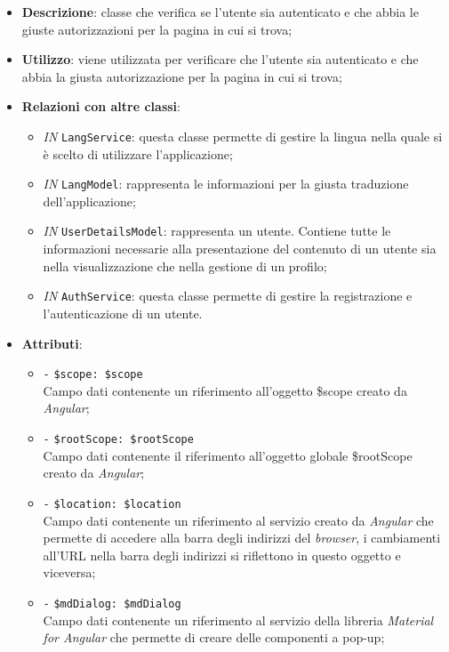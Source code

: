 		\begin{itemize}
			\item \textbf{Descrizione}: classe che verifica se l'utente sia autenticato e che abbia le giuste autorizzazioni per la pagina in cui si trova;
			\item \textbf{Utilizzo}: viene utilizzata per verificare che l’utente sia autenticato e che abbia la giusta autorizzazione per la pagina in cui si trova;
			\item \textbf{Relazioni con altre classi}: 
			\begin{itemize}
				\item \textit{IN} \texttt{LangService}: questa classe permette di gestire la lingua nella quale si è scelto di utilizzare l'applicazione;
				\item \textit{IN} \texttt{LangModel}: rappresenta le informazioni per la giusta traduzione dell'applicazione;
				\item \textit{IN} \texttt{UserDetailsModel}: rappresenta un utente. Contiene tutte le informazioni necessarie alla presentazione del contenuto di un utente sia nella visualizzazione che nella gestione di un profilo;
				\item \textit{IN} \texttt{AuthService}: questa classe permette di gestire la registrazione e l'autenticazione di un utente.
			\end{itemize}
			\item \textbf{Attributi}: 
			\begin{itemize}
				\item \texttt{-} \texttt{\$scope: \$scope} \\
				Campo dati contenente un riferimento all'oggetto \$scope creato da \textit{Angular};
				\item \texttt{-} \texttt{\$rootScope: \$rootScope} \\
				Campo dati contenente il riferimento all'oggetto globale \$rootScope creato da \textit{Angular};
				\item \texttt{-} \texttt{\$location: \$location} \\
				Campo dati contenente un riferimento al servizio creato da \textit{Angular} che permette di accedere alla barra degli indirizzi del \textit{browser}, i cambiamenti all'URL nella barra degli indirizzi si riflettono in questo oggetto e viceversa;
				\item \texttt{-} \texttt{\$mdDialog: \$mdDialog} \\
				Campo dati contenente un riferimento al servizio della libreria \textit{Material for Angular} che permette di creare delle componenti a pop-up;

\end{itemize}
\end{itemize}
